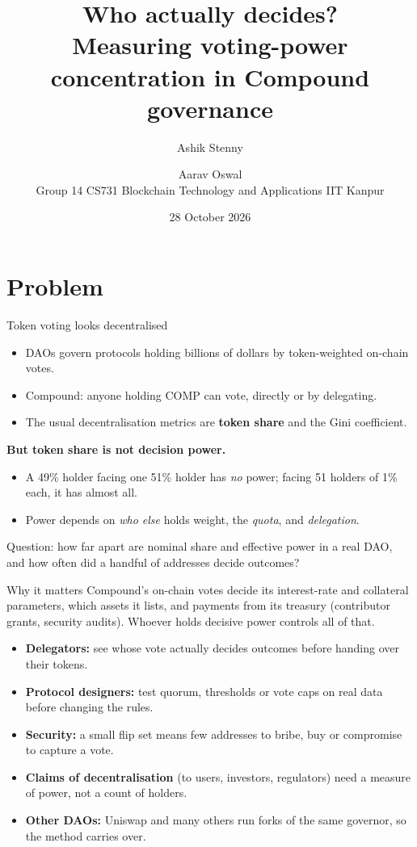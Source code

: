 \documentclass[aspectratio=169,11pt]{beamer}
\title{Who actually decides?\\[0.2em]\large Measuring voting-power concentration in Compound governance}
\author{Ashik Stenny \and Aarav Oswal\\[0.3em]\small Group 14 \textperiodcentered{} CS731 Blockchain Technology and Applications \textperiodcentered{} IIT Kanpur}
\date{28 October 2026}
\newcommand{\muted}[1]{\textcolor{ink2}{#1}}
\begin{document}
\begin{frame}
  \titlepage
\end{frame}

\section{Problem}
\begin{frame}{Token voting looks decentralised}
  \begin{itemize}
    \item DAOs govern protocols holding billions of dollars by token-weighted on-chain votes.
    \item Compound: anyone holding COMP can vote, directly or by delegating.
    \item The usual decentralisation metrics are \textbf{token share} and the Gini coefficient.
  \end{itemize}
  \vspace{1em}
  \textbf{But token share is not decision power.}
  \begin{itemize}
    \item A 49\% holder facing one 51\% holder has \emph{no} power; facing 51 holders of 1\% each, it has almost all.
    \item Power depends on \emph{who else} holds weight, the \emph{quota}, and \emph{delegation}.
  \end{itemize}
  \vspace{1em}
  \muted{Question: how far apart are nominal share and effective power in a real DAO, and how often did a handful of addresses decide outcomes?}
\end{frame}

\begin{frame}{Why it matters}
  \small
  Compound's on-chain votes decide its interest-rate and collateral parameters, which assets it lists, and payments from its treasury (contributor grants, security audits). Whoever holds decisive power controls all of that.
  \vspace{0.6em}
  \begin{itemize}
    \item \textbf{Delegators:} see whose vote actually decides outcomes before handing over their tokens.
    \item \textbf{Protocol designers:} test quorum, thresholds or vote caps on real data before changing the rules.
    \item \textbf{Security:} a small flip set means few addresses to bribe, buy or compromise to capture a vote.
    \item \textbf{Claims of decentralisation} (to users, investors, regulators) need a measure of power, not a count of holders.
    \item \textbf{Other DAOs:} Uniswap and many others run forks of the same governor, so the method carries over.
  \end{itemize}
\end{frame}
\end{document}
